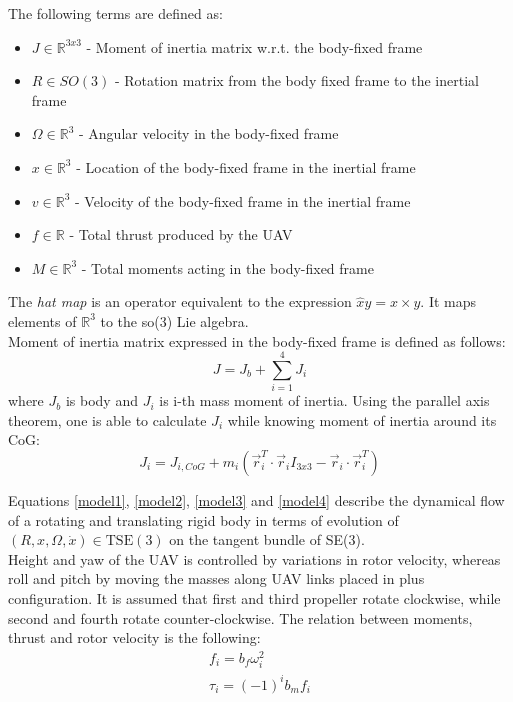 \noindent The following terms are defined as:

\begin{itemize}
	\item $J \in \mathbb{R}^{3x3}$ - Moment of inertia matrix w.r.t. the body-fixed frame
	
	\item $R \in SO(3)$ - Rotation matrix from the body fixed frame to the inertial frame
	
	\item $\Omega \in \mathbb{R}^3$ - Angular velocity in the body-fixed frame
	
	\item $x \in \mathbb{R}^3$ - Location of the body-fixed frame in the inertial frame
	
	\item $v \in \mathbb{R}^3$ - Velocity of the body-fixed frame in the inertial frame
	
	\item $f \in \mathbb{R}$ - Total thrust produced by the UAV
	
	\item $M \in \mathbb{R}^3$ - Total moments acting in the body-fixed frame
\end{itemize}

\noindent The \textit{hat map} is an operator equivalent to the expression $\hat{x}y = x \times y$. It maps elements of $\mathbb{R}^3$ to the so(3) Lie algebra. \\
Moment of inertia matrix expressed in the body-fixed frame is defined as follows:
\begin{equation}
	J = J_b + \sum_{i=1}^{4}J_i
\end{equation}
where $J_b$ is body and $J_i$ is i-th mass moment of inertia. Using the parallel axis theorem, one is able to calculate $J_i$ while knowing moment of inertia around its CoG:
\begin{equation}
	J_i = J_{i,CoG} + m_i(\vec{r}_i^T \cdot \vec{r}_i I_{3x3} - \vec{r}_i \cdot \vec{r}_i^T)
\end{equation}

\indent Equations \ref{model1}, \ref{model2}, \ref{model3} and \ref{model4} describe the dynamical flow of a rotating and translating rigid body in terms of evolution of $(R,x,\Omega,\dot{x})\in \text{TSE}(3)$ on the tangent bundle of SE(3). \\
\indent Height and yaw of the UAV is controlled by variations in rotor velocity, whereas roll and pitch by moving the masses along UAV links placed in plus configuration. It is assumed that first and third propeller rotate clockwise, while second and fourth rotate counter-clockwise. The relation between moments, thrust and rotor velocity is the following:
\begin{gather}
	f_i = b_f \omega_{i}^2 \label{force}\\
	\tau_i = (-1)^i b_m f_i
\end{gather}

